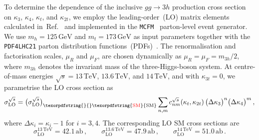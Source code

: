 \documentclass{SciPost}
\def\beq{\begin{equation}}
\def\eeq{\end{equation}}
\providecommand{\DIFaddtex}[1]{{\protect\color{red} #1}} %
\providecommand{\DIFdeltex}[1]{} %
\providecommand{\DIFaddbegin}{} %
\providecommand{\DIFaddend}{} %
\providecommand{\DIFdelbegin}{} %
\providecommand{\DIFdelend}{} %
\providecommand{\DIFadd}[1]{\texorpdfstring{\DIFaddtex{#1}}{#1}} %
\providecommand{\DIFdel}[1]{\texorpdfstring{\DIFdeltex{#1}}{}} %
\begin{document}
To determine the dependence of the inclusive $gg \to 3h$ production cross section on $\kappa_3$, $\kappa_4$, $\kappa_t$, and $\kappa_{2t}$, we employ the leading-order~(LO) matrix elements calculated in~Ref.~\cite{Campbell:2025llb} and implemented in the \DIFdelbegin %
\DIFdel{MCFM}%
\DIFdelend \DIFaddbegin \DIFadd{\texttt{MCFM}}\DIFaddend ~\cite{Campbell:1999ah,Campbell:2011bn,Campbell:2015qma,Campbell:2019dru} parton-level event generator. We use $m_h = 125\,\mathrm{GeV}$ and $m_t = 173\,\mathrm{GeV}$ as input parameters together with the \DIFdelbegin %
\DIFdel{PDF4LHC21}%
\DIFdelend \DIFaddbegin \DIFadd{\texttt{PDF4LHC21} }\DIFaddend parton distribution functions~(PDFs)~\cite{PDF4LHCWorkingGroup:2022cjn}. The renormalisation and factorisation scales, $\mu_R$ and $\mu_F$, are chosen dynamically as $\mu_R = \mu_F = m_{3h}/2$, where $m_{3h}$ denotes the invariant mass of the \DIFdelbegin \DIFdel{three-Higgs system. For collision energies of }\DIFdelend \DIFaddbegin \DIFadd{three-Higgs-boson system. At centre-of-mass energies }\DIFaddend $\sqrt{s}=13\,\mathrm{TeV}$, \DIFdelbegin \DIFdel{$\sqrt{s}=13.6\,\mathrm{TeV}$, and $\sqrt{s}=14\,\mathrm{TeV}$}\DIFdelend \DIFaddbegin \DIFadd{$13.6\,\mathrm{TeV}$, and $14\,\mathrm{TeV}$, and with $\kappa_{3t}=0$}\DIFaddend , we parametrise the LO cross section as
\beq \label{eq:BSMLO}
\sigma_{\mathrm{LO}}^{\sqrt{s}} = \big(\sigma_{\mathrm{LO}}^{\sqrt{s}}\big)_{\DIFdelbegin %
\DIFdel{SM}\DIFdelend \DIFaddbegin \DIFadd{\mathrm{SM}}\DIFaddend } \sum_{n,m} c_{nm}^{\sqrt{s}}\!\left(\kappa_t,\kappa_{2t}\right) \big(\Delta\kappa_3\big)^n \big(\Delta\kappa_4\big)^m \,,
\eeq
where $\Delta\kappa_i=\kappa_i-1$ for $i=3,4$. The corresponding LO SM cross sections are
\beq \label{eq:SMLO}
\sigma_{\mathrm{LO}}^{13\,\mathrm{TeV}} = 42.1\,\mathrm{ab} \,, \qquad
\sigma_{\mathrm{LO}}^{13.6\,\mathrm{TeV}} = 47.9\,\mathrm{ab} \,, \qquad
\sigma_{\mathrm{LO}}^{14\,\mathrm{TeV}} = 51.0\,\mathrm{ab} \,.
\eeq
\end{document}
